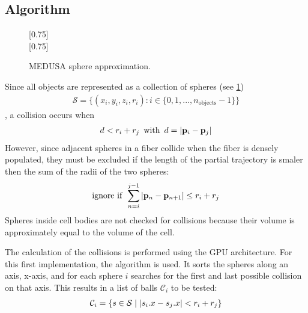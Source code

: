 \subsection{Algorithm}
%
\begin{figure}[!t]
    \centering
    \setlength{\tikzwidth}{0.75\textwidth}
    [0.75\textwidth]{
    }
    \\[2em]
    [0.75\textwidth]{
    }
    \caption{\ac{MEDUSA} sphere approximation.}
    \label{fig:medusaCell}
\end{figure}
%
Since all objects are represented as a collection of spheres (see \cref{fig:medusaCell})
\begin{align}
    \mathcal{S} = \{ (x_i,y_i,z_i,r_i) : i \in \{0, 1, ..., n_\text{objects}-1\}  \}
\end{align}
%
, a collision occurs when
%
\begin{align}
d<r_i+r_j \enspace \text{with} \enspace d = \lvert\mathbf{p}_i - \mathbf{p}_j\rvert
\end{align}
%
However, since adjacent spheres in a fiber collide when the fiber is densely populated, they must be excluded if the length of the partial trajectory is smaler then the sum of the radii of the two spheres:
\begin{align}
\text{ignore if} \enspace \sum_{n=i}^{j-1} \, \lvert\mathbf{p}_n - \mathbf{p}_{n+1}\rvert \leq  r_i + r_j 
\end{align}
%
Spheres inside cell bodies are not checked for collisions because their volume is approximately equal to the volume of the cell.
\par
%
The calculation of the collisions is performed using the GPU architecture.
For this first implementation, the algorithm  \cite{Karras2012} is used.
It sorts the spheres along an axis, \obda{} x-axis, and for each sphere $i$ searches for the first and last possible collision on that axis.
This results in a list of balls $\mathcal{C}_i$ to be tested:
\begin{align}
\begin{split}
\mathcal{C}_i = \{ s \in \mathcal{S} \mid \lvert s_i.x - s_j.x\rvert < r_i+r_j \}
\end{split}
\end{align}
%
\begin{lstfloat}[!t]
	
	\caption{Pseudocode of \acs{MEDUSA}s collision checking.}
	\label{alg:medusa_collision}
\end{lstfloat}

